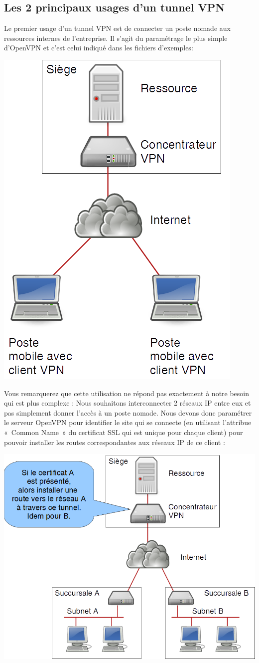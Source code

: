 \documentclass[a4paper,11pt]{article}
\begin{document}
\subsection{Les 2 principaux usages d'un tunnel VPN}
Le premier usage d'un tunnel VPN est de connecter un poste nomade aux ressources internes de l'entreprise. Il s'agit du paramétrage le plus simple d'OpenVPN et c'est celui indiqué dans les fichiers d'exemples:
\begin{center}
\includegraphics[width=0.4\linewidth]{OpenVPN-roadwarrior}
\end{center}
Vous remarquerez que cette utilisation ne répond pas exactement à notre besoin qui est plus complexe : Nous souhaitons interconnecter 2 réseaux IP entre eux et pas simplement donner l'accès à un poste nomade. Nous devons donc paramétrer le serveur OpenVPN pour identifier le site qui se connecte (en utilisant l'attribue «~Common Name~» du certificat SSL qui est unique pour chaque client) pour pouvoir installer les routes correspondantes aux réseaux IP de ce client :
\begin{center}
\includegraphics[width=0.7\linewidth]{OpenVPN-LAN2LAN}
\end{center}
\end{document}
